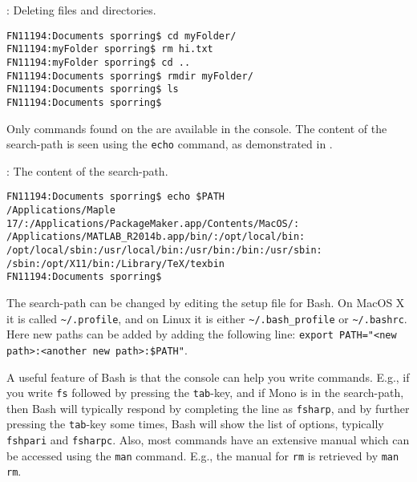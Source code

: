 \begin{codeNOutput}[label=LinuxRm]{: Deleting files and directories.}
  \begin{lstlisting}[language=console,escapechar=§]
FN11194:Documents sporring$ cd myFolder/
FN11194:myFolder sporring$ rm hi.txt 
FN11194:myFolder sporring$ cd ..
FN11194:Documents sporring$ rmdir myFolder/
FN11194:Documents sporring$ ls
FN11194:Documents sporring$ 
\end{lstlisting}
\end{codeNOutput}
Only commands found on the  are available in the console. The content of the search-path is seen using the \lstinline[language=console]{echo} command, as demonstrated in .
\begin{codeNOutput}[label=LinuxSearchPath]{: The content of the search-path.}
  \begin{lstlisting}[language=console,escapechar=§]
FN11194:Documents sporring$ echo $PATH
/Applications/Maple 17/:/Applications/PackageMaker.app/Contents/MacOS/: /Applications/MATLAB_R2014b.app/bin/:/opt/local/bin: /opt/local/sbin:/usr/local/bin:/usr/bin:/bin:/usr/sbin: /sbin:/opt/X11/bin:/Library/TeX/texbin
FN11194:Documents sporring$ 
\end{lstlisting}%
\end{codeNOutput}
The search-path can be changed by editing the setup file for Bash. On MacOS X it is called \lstinline[language=console]{~/.profile}, and on Linux it is either \lstinline[language=console]{~/.bash_profile} or \lstinline[language=console]{~/.bashrc}. Here new paths can be added by adding the following line: \lstinline[language=console]{export PATH="<new path>:<another new path>:$PATH"}. %

A useful feature of Bash is that the console can help you write commands. E.g., if you write \lstinline[language=console]{fs} followed by pressing the \lstinline[language=console]{tab}-key, and if Mono is in the search-path, then Bash will typically respond by completing the line as \lstinline[language=console]{fsharp}, and by further pressing the \lstinline[language=console]{tab}-key some times, Bash will show the list of options, typically \lstinline[language=console]{fshpari} and \lstinline[language=console]{fsharpc}. Also, most commands have an extensive manual which can be accessed using the \lstinline[language=console]{man} command. E.g., the manual for \lstinline[language=console]{rm} is retrieved by \lstinline[language=console]{man rm}.

